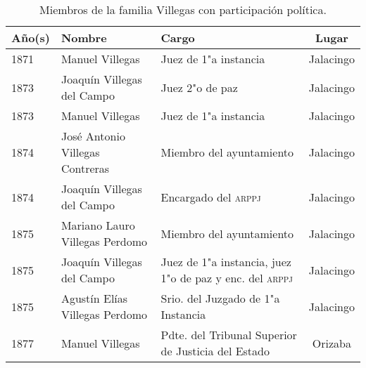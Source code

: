 \documentclass[14pt,twoside,final]{extbook} %
\begin{document}
\begin{sidewaystable}
\centering
\caption[Miembros de la familia Villegas con participación política]{Miembros de la familia Villegas con participación política.}
\begin{small}
\lfstyle
\begin{tabular}{@{}lllc@{}}
\toprule
Año(s) & Nombre & Cargo & \multicolumn{1}{c}{Lugar} \\
\midrule
1871 & Manuel Villegas\index[nombres]{Villegas Contreras, Manuel!juez de 1.\textsu{a} instancia} & Juez de 1"a instancia & Jalacingo \\
1873 & Joaquín Villegas del Campo\index[nombres]{Villegas del Campo, Joaquin@Villegas del Campo, Joaquín!juez 2.\textsu{o} de paz} & Juez 2"o de paz & Jalacingo \\
1873\capitaldash 1874 & Manuel Villegas\index[nombres]{Villegas Contreras, Manuel!juez de 1.\textsu{a} instancia} & Juez de 1"a instancia & Jalacingo \\
1874 & José Antonio Villegas Contreras\index[nombres]{Villegas Contreras, Jose Antonio@Villegas Contreras, José Antonio!miembro del ayuntamiento} & Miembro del ayuntamiento & Jalacingo \\
1874 & Joaquín Villegas del Campo\index[nombres]{Villegas del Campo, Joaquin@Villegas del Campo, Joaquín!enc. del \textsc{arppj}} & Encargado del \textsc{arppj} & Jalacingo \\
1875 & Mariano Lauro Villegas Perdomo\index[nombres]{Villegas Perdomo, Mariano Lauro!miembro del ayuntamiento} & Miembro del ayuntamiento & Jalacingo \\
1875 & Joaquín Villegas del Campo\index[nombres]{Villegas del Campo, Joaquin@Villegas del Campo, Joaquín!juez de 1.\textsu{a} instancia} & Juez de 1"a instancia, juez 1"o de paz\index[nombres]{Villegas del Campo, Joaquin@Villegas del Campo, Joaquín!juez 1.\textsu{o} de paz} y enc. del \textsc{arppj}\index[nombres]{Villegas del Campo, Joaquin@Villegas del Campo, Joaquín!enc. del \textsc{arppj}} & Jalacingo \\
1875 & Agustín Elías Villegas Perdomo\index[nombres]{Villegas Perdomo, Agustin Elias@Villegas Perdomo, Agustín Elías!srio. del Juzgado de 1.\textsu{a} Instancia} & Srio. del Juzgado de 1"a Instancia & Jalacingo \\
1877 & Manuel Villegas\index[nombres]{Villegas Contreras, Manuel!presidente del Tribunal Superior de Justicia del Estado} & Pdte. del Tribunal Superior de Justicia del Estado & Orizaba \\

\end{tabular}
\end{small}
\end{sidewaystable}
\end{document}

